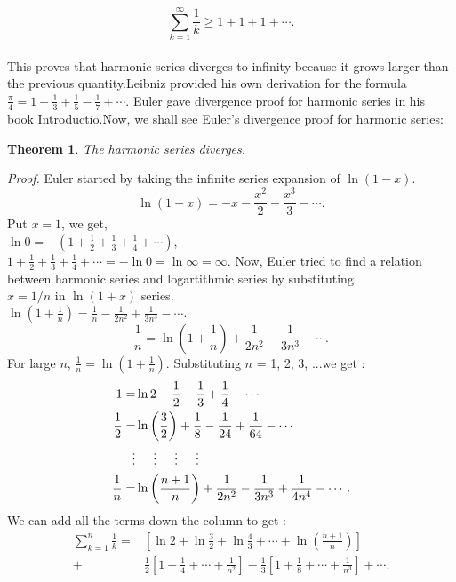 \documentclass[a4paper,reqno,11pt]{book}
\theoremstyle{plain}%
\newtheorem{thm}{Theorem}[chapter]
\theoremstyle{definition}
\begin{document}
        $$\sum_{k=1}^{\infty}\frac{1}{k}  \geq 1 + 1 + 1 + \cdots. $$\\
This proves that harmonic series diverges to infinity because it grows larger than the previous quantity.Leibniz provided his own derivation for the formula $\frac{\pi}{4} = 1 - \frac{1}{3} + \frac{1}{5} - \frac{1}{7} + \cdots. $ Euler gave divergence proof for harmonic series in his book Introductio.Now, we shall see Euler's divergence proof for harmonic series:\\
\begin{thm}\label{thm:Type 1} The harmonic series diverges.\\
\end{thm}
\textit{Proof.} Euler started by taking the infinite series expansion of  $\ln(1-x)$.\\
$$ \ln(1-x) = -x - \frac{x^2}{2} - \frac{x^3}{3} - \cdots. $$
Put $x=1$, we get,\\
$ \ln0 = -(1 + \frac{1}{2} + \frac{1}{3} + \frac{1}{4} + \cdots) $,\\
$ 1 + \frac{1}{2} + \frac{1}{3} + \frac{1}{4} + \cdots = -\ln0 = \ln\infty = \infty. $
Now, Euler tried to find a relation between harmonic series and logartithmic series by substituting\\ $x = 1/n$ in $\ln (1+x)$ series.\\
$ \ln(1+\frac{1}{n}) = \frac{1}{n} - \frac{1}{2n^2} + \frac{1}{3n^3} - \cdots. $\\
$$ \frac{1}{n} = \ln(1+\frac{1}{n}) + \frac{1}{2n^2} - \frac{1}{3n^3} + \cdots. $$
For large $n$, $\frac{1}{n} = \ln\left(1+\frac{1}{n}\right)$. Substituting $n$ = 1, 2, 3, ...we get :
\begin{align*}
1 =& \ln2 + \frac{1}{2} - \frac{1}{3} + \frac{1}{4} - \cdots\\
\frac{1}{2} =& \ln\left(\frac{3}{2}\right) + \frac{1}{8} - \frac{1}{24} + \frac{1}{64} - \cdots\\
\vdots& \hspace{0.5cm} \vdots \hspace{0.5cm} \vdots \hspace{0.5cm} \vdots \\
\frac{1}{n} =& \ln\left(\frac{n+1}{n}\right) + \frac{1}{2n^2} - \frac{1}{3n^3} + \frac{1}{4n^4} - \cdots.\\
\end{align*}
We can add all the terms down the column to get :
\begin{align*}
\sum_{k=1}^{n} \frac{1}{k} =& [ \ln2 + \ln\frac{3}{2} + \ln\frac{4}{3} + \cdots + \ln(\frac{n+1}{n})]\\ +& \frac{1}{2}
[1 + \frac{1}{4} + \cdots + \frac{1}{n^2}] - \frac{1}{3} [1 + \frac{1}{8} + \cdots + \frac{1}{n^3}] + \cdots. 
\end{align*}
\end{document}
